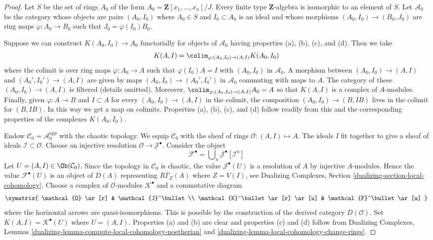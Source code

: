 \begin{proof}
Let $S$ be the set of rings $A_0$ of the form
$A_0 = \mathbf{Z}[x_1, \ldots, x_n]/J$.
Every finite type $\mathbf{Z}$-algebra is isomorphic to
an element of $S$. Let $\mathcal{A}_0$ be the category whose objects
are pairs $(A_0, I_0)$ where $A_0 \in S$ and $I_0 \subset A_0$
is an ideal and whose morphisms $(A_0, I_0) \to (B_0, J_0)$ are
ring maps $\varphi : A_0 \to B_0$ such that $J_0 = \varphi(I_0)B_0$.

\medskip\noindent
Suppose we can construct $K(A_0, I_0) \to A_0$ functorially for
objects of $\mathcal{A}_0$ having properties (a), (b), (c), and (d).
Then we take
$$
K(A, I) = \colim_{\varphi : (A_0, I_0) \to (A, I)} K(A_0, I_0)
$$
where the colimit is over ring maps $\varphi : A_0 \to A$ such
that $\varphi(I_0)A = I$ with $(A_0, I_0)$ in $\mathcal{A}_0$.
A morphism between $(A_0, I_0) \to (A, I)$ and $(A_0', I_0') \to (A, I)$
are given by maps $(A_0, I_0) \to (A_0', I_0')$ in $\mathcal{A}_0$
commuting with maps to $A$.
The category of these $(A_0, I_0) \to (A, I)$ is filtered
(details omitted). Moreover, $\colim_{\varphi : (A_0, I_0) \to (A, I)} A_0 = A$
so that $K(A, I)$ is a complex of $A$-modules.
Finally, given $\varphi : A \to B$ and $I \subset A$
for every $(A_0, I_0) \to (A, I)$ in the colimit, the composition
$(A_0, I_0) \to (B, IB)$ lives in the colimit for $(B, IB)$.
In this way we get a map on colimits. Properties (a), (b), (c), and (d)
follow readily from this and the corresponding
properties of the complexes $K(A_0, I_0)$.

\medskip\noindent
Endow $\mathcal{C}_0 = \mathcal{A}_0^{opp}$ with the chaotic topology.
We equip $\mathcal{C}_0$ with the sheaf of rings
$\mathcal{O} : (A, I) \mapsto A$. The ideals $I$ fit together to give a
sheaf of ideals $\mathcal{I} \subset \mathcal{O}$.
Choose an injective resolution $\mathcal{O} \to \mathcal{J}^\bullet$.
Consider the object
$$
\mathcal{F}^\bullet = \bigcup\nolimits_n \mathcal{J}^\bullet[\mathcal{I}^n]
$$
Let $U = (A, I) \in \Ob(\mathcal{C}_0)$.
Since the topology in $\mathcal{C}_0$ is chaotic, the value
$\mathcal{J}^\bullet(U)$ is a resolution of $A$ by injective
$A$-modules. Hence the value $\mathcal{F}^\bullet(U)$ is an
object of $D(A)$ representing $R\Gamma_Z(A)$ where $Z = V(I)$, see
Dualizing Complexes, Section \ref{dualizing-section-local-cohomology}.
Choose a complex of $\mathcal{O}$-modules $\mathcal{K}^\bullet$
and a commutative diagram
$$
\xymatrix{
\mathcal{O} \ar[r] & \mathcal{J}^\bullet \\
\mathcal{K}^\bullet \ar[r] \ar[u] & \mathcal{F}^\bullet \ar[u]
}
$$
where the horizontal arrows are quasi-isomorphisms. This is possible
by the construction of the derived category $D(\mathcal{O})$.
Set $K(A, I) = \mathcal{K}^\bullet(U)$ where $U = (A, I)$.
Properties (a) and (b) are clear and properties (c) and (d)
follow from Dualizing Complexes, Lemmas
\ref{dualizing-lemma-compute-local-cohomology-noetherian} and
\ref{dualizing-lemma-local-cohomology-change-rings}.
\end{proof}

